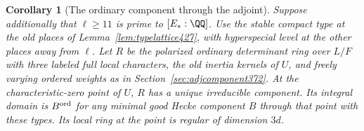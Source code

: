 \documentclass[a4paper,11pt]{article}
\newtheorem{corollary}[proposition]{Corollary}
\theoremstyle{definition}
\theoremstyle{remark}
\numberwithin{equation}{section}
\begin{document}
\begin{corollary}[The ordinary component through the adjoint]\leavevmode
\label{cor:seedcomponent437}
Suppose additionally that \(\ell\ge11\) is prime to
\([E_*:\QQ]\). Use the stable compact type at the old places
of Lemma~\ref{lem:typelattice427}, with hyperspecial level
at the other places away from \(\ell\).
Let \(R\) be the polarized ordinary determinant ring over
\(L/F\) with three labeled full local characters, the old
inertia kernels of \(U\), and freely varying ordered
weights as in Section~\ref{sec:adjcomponent372}. At the
characteristic-zero point of \(U\), \(R\) has a unique
irreducible component. Its integral domain is \(B^{\rm ord}\)
for any minimal good Hecke component \(B\) through that
point with these types. Its local ring at the point is
regular of dimension \(3d\).
\end{corollary}
\end{document}
